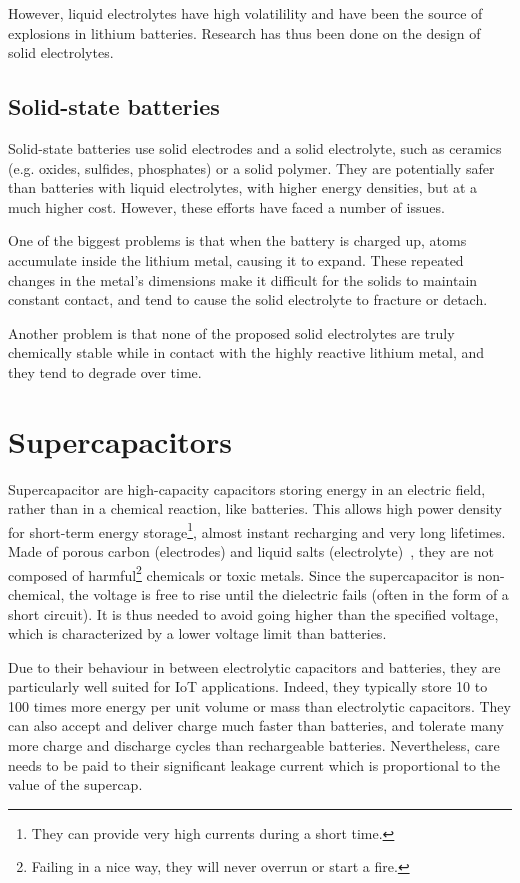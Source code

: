 \documentclass{EPL-master-thesis-covers-EN}
\begin{document}
However, liquid electrolytes have high volatilility and have been the source of explosions in lithium batteries. Research has thus been done on the design of solid electrolytes.

\subsection*{Solid-state batteries}

Solid-state batteries use solid electrodes and a solid electrolyte, such as ceramics (e.g. oxides, sulfides, phosphates) or a solid polymer. They are potentially safer than batteries with liquid electrolytes, with higher energy densities, but at a much higher cost.
However, these efforts have faced a number of issues.

One of the biggest problems is that when the battery is charged up, atoms accumulate inside the lithium metal, causing it to expand. These repeated changes in the metal’s dimensions make it difficult for the solids to maintain constant contact, and tend to cause the solid electrolyte to fracture or detach.

Another problem is that none of the proposed solid electrolytes are truly chemically stable while in contact with the highly reactive lithium metal, and they tend to degrade over time.

\section{Supercapacitors}

Supercapacitor are high-capacity capacitors storing energy in an electric field, rather than in a chemical reaction, like batteries. This allows high power density for short-term energy storage\footnote{They can provide very high currents during a short time.}, almost instant recharging and very long lifetimes. Made of porous carbon (electrodes) and liquid salts (electrolyte)~\cite{BAPTISTA20191153}, they are not composed of harmful\footnote{Failing in a nice way, they will never overrun or start a fire.} chemicals or toxic metals.
Since the supercapacitor is non-chemical, the voltage is free to rise until the dielectric fails (often in the form of a short circuit). It is thus needed to avoid going higher than the specified voltage, which is characterized by a lower voltage limit than batteries.

Due to their behaviour in between electrolytic capacitors and batteries, they are particularly well suited for IoT applications. Indeed, they typically store 10 to 100 times more energy per unit volume or mass than electrolytic capacitors. They can also accept and deliver charge much faster than batteries, and tolerate many more charge and discharge cycles than rechargeable batteries. Nevertheless, care needs to be paid to their significant leakage current which is proportional to the value of the supercap.
\end{document}
